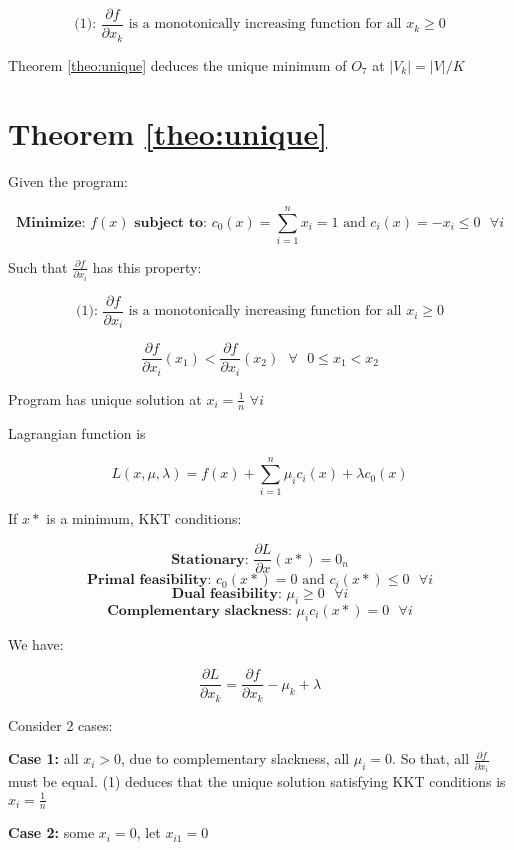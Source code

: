 \[
\text{(1): } \text{$\frac{\partial f}{\partial x_k}$ is a monotonically increasing function for all $x_k \geq 0$}
\]

Theorem \ref{theo:unique} deduces the unique minimum of $O_7$ at $|V_k| = |V|/K$

\section{Theorem \ref{theo:unique}}

Given the program:

\[
\textbf{Minimize: } f(x)
\textbf{ subject to: } c_0(x) = \sum_{i=1}^{n} x_i = 1 \text{ and } c_i(x) = -x_i \leq 0 \text{ } \forall i
\]


Such that $\frac{\partial f}{\partial x_i}$ has this property:

\[
\text{(1): } \text{$\frac{\partial f}{\partial x_i}$ is a monotonically increasing function for all $x_i \geq 0$}
\]

\[
\frac{\partial f}{\partial x_i}(x_1) < \frac{\partial f}{\partial x_i}(x_2) \text{ } \forall \text{ } 0 \leq x_1 < x_2
\]

\begin{theorem}
\label{theo:unique}
Program has unique solution at $x_i = \frac{1}{n}$ $\forall i$
\end{theorem}

Lagrangian function is

\[
L(x, \mu, \lambda) = f(x) + \sum_{i=1}^{n} \mu_i c_i(x) + \lambda c_0(x)
\]

If $x*$ is a minimum, KKT conditions:

\[
\textbf{Stationary: } \frac{\partial L}{\partial x}(x*) = 0_n
\]
\[
\textbf{Primal feasibility: } c_0(x*) = 0 \text{ and } c_i(x*) \leq 0 \text{ } \forall i
\]
\[
\textbf{Dual feasibility: } \mu_i \geq 0 \text{ } \forall i
\]
\[
\textbf{Complementary slackness: } \mu_i c_i(x*) = 0 \text{ } \forall i
\]

We have:

\[
\frac{\partial L}{\partial x_k} = \frac{\partial f}{\partial x_k} - \mu_k + \lambda
\]

Consider 2 cases:

\textbf{Case 1:} all $x_i > 0$, due to complementary slackness, all $\mu_i = 0$. So that, all $\frac{\partial f}{\partial x_i}$ must be equal. (1) deduces that the unique solution satisfying KKT conditions is $x_i = \frac{1}{n}$

\textbf{Case 2:} some $x_i = 0$, let $x_{i1} = 0$

